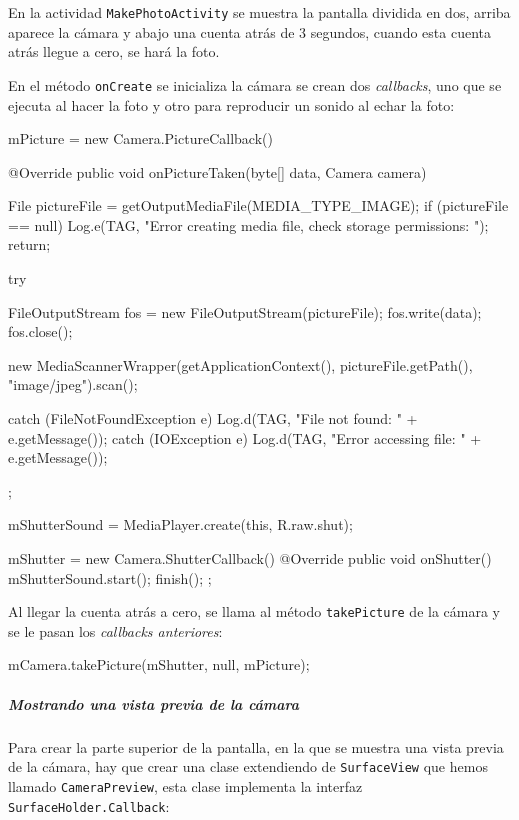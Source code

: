 \documentclass[	DIV=calc,%
							paper=a4,%
							fontsize=11pt]{scrartcl}	 					%
\begin{document}
En la actividad \texttt{MakePhotoActivity} se muestra la pantalla
dividida en dos, arriba aparece la cámara y abajo una cuenta atrás de 3
segundos, cuando esta cuenta atrás llegue a cero, se hará la foto.

En el método \texttt{onCreate} se inicializa la cámara se crean dos
\emph{callbacks}, uno que se ejecuta al hacer la foto y otro para
reproducir un sonido al echar la foto:

\begin{javacode}
	mPicture = new Camera.PictureCallback() {

			@Override
			public void onPictureTaken(byte[] data, Camera camera) {

					File pictureFile = getOutputMediaFile(MEDIA_TYPE_IMAGE);
					if (pictureFile == null) {
							Log.e(TAG, "Error creating media file, check storage permissions: ");
							return;
					}

					try {
							FileOutputStream fos = new FileOutputStream(pictureFile);
							fos.write(data);
							fos.close();

							new MediaScannerWrapper(getApplicationContext(), pictureFile.getPath(), "image/jpeg").scan();
					} catch (FileNotFoundException e) {
							Log.d(TAG, "File not found: " + e.getMessage());
					} catch (IOException e) {
							Log.d(TAG, "Error accessing file: " + e.getMessage());
					}

			}
	};

	mShutterSound = MediaPlayer.create(this, R.raw.shut);

	mShutter = new Camera.ShutterCallback() {
			@Override
			public void onShutter() {
					mShutterSound.start();
					finish();
			}
	};
\end{javacode}

Al llegar la cuenta atrás a cero, se llama al método
\texttt{takePicture} de la cámara y se le pasan los \emph{callbacks
anteriores}:

\begin{javacode}
mCamera.takePicture(mShutter, null, mPicture);
\end{javacode}

\subparagraph{Mostrando una vista previa de la
cámara}\label{mostrando-una-vista-previa-de-la-cuxe1mara}

Para crear la parte superior de la pantalla, en la que se muestra una
vista previa de la cámara, hay que crear una clase extendiendo de
\texttt{SurfaceView} que hemos llamado \texttt{CameraPreview}, esta
clase implementa la interfaz \texttt{SurfaceHolder.Callback}:
\end{document}
